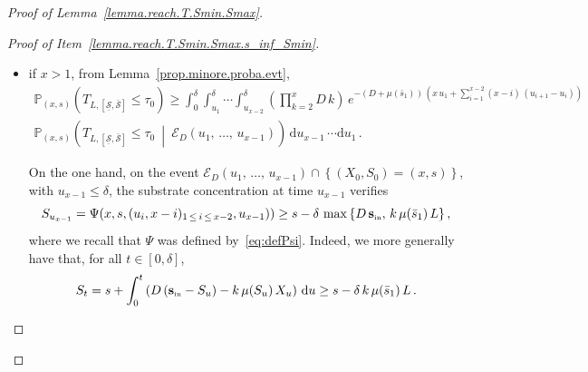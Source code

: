 \documentclass[10pt]{amsart}
\theoremstyle{definition}\newtheorem{defi}[theo]{Definition}\newtheorem{rema}[theo]{Remark}\newtheorem{exam}[theo]{Example}\newtheorem{exem}[theo]{Example}\newtheorem{nota}[theo]{Notation}
\newcommand{\PP}{\mathbb{P}}
\newcommand{\clE}{\mathcal{E}}
\newcommand{\Sin}{{\mathbf s}_{\textrm{\tiny\rm in}}}
\newcommand{\dif}{\mathrm{d}}
\newcommand{\Smin}{\underline{\mathcal{S}}}
\newcommand{\Smax}{\bar{\mathcal{S}}}
\newcommand{\barmu}{\mu(\bar s_1)}
\newcommand{\phit}{\phi_\textsf{t}^{-1}}
\newcommand{\1}{\mathbf{1}}
\begin{document}
\begin{proof}[Proof of Lemma~\ref{lemma.reach.T.Smin.Smax}]
\begin{proof}[{Proof of Item~\eqref{lemma.reach.T.Smin.Smax.s_inf_Smin}}]
\begin{itemize}
\begin{align*}
&\leq \phit \Big(1,s-\delta\,\max\left\{D\,\Sin,\,k\,\barmu\,L\right\},s\Big)+\phit \Big(1,s,\Smin\Big)
\\
&\leq T+\phit \Big(1,s,\Smin\Big) = \tau_0 - \delta\,.
\end{align*}
Then, since from Lemma~\ref{lem:rapprochement} $t\mapsto \phi(1, s_0,t)$ is increasing,
\begin{align*}
\phi(1,s_0,\tau_0-\delta) &\geq \phi\left(1,s_0,\phit\left(1, s_0,\Smin \right)\right)=\Smin\,.
\end{align*}
On the event $\{(X_0,S_0)=(1,s_0), \, T_1> \tau_0-\delta \}$, we then have $S_{\tau_0-\delta} \geq \Smin$ a.s. Since $(S_t)_{t\,\geq\,0}$ is a continuous process, from the intermediate value theorem, $(S_t)_{t\,\geq \,0}$ reaches $\Smin$ in the time interval $[0,\tau_0-\delta]$. Moreover, since $\Smin<\bar s_1$ then
\[
\PP_{(1,s_0)}
\left(T_{L,[\Smin,\Smax]}\leq \tau_0-\delta \, \middle| \, T_1> \tau_0-\delta\right)=1
\]
and therefore
\begin{align}\label{eq.reach.Smin.Smax.befor.tmax.x1}
\PP_{(1,s_0)}\left(T_{L,[\Smin,\Smax]}\leq \tau_0-\delta \right) &\geq e^{-(D+\barmu)\,(\tau_0-\delta)}\,.
\end{align}
Since $\PP_{(1,s)}(T_{L,[\Smin,\Smax]}\leq \tau_0) \geq \PP_{(1,s)}(T_{L,[\Smin,\Smax]}\leq \tau_0-\delta)$, taking $s_0=s$ leads to the result.

\item if $x>1$, from Lemma~\ref{prop.minore.proba.evt},
\begin{multline*}
\PP_{(x,s)}\left(T_{L,[\Smin,\Smax]}\leq \tau_0\right) \geq
\int_0^{\delta} \int_{u_1}^{\delta}\cdots \int_{u_{x-2}}^{\delta}
\left(\prod_{k=2}^{x}D\,k\right)\, e^{-(D+\barmu)\,\left(x\,u_1+\sum\limits_{i=1}^{x-2}(x-i)\,(u_{i+1}-u_{i})\right)}
\\
\PP_{(x,s)}
\left(T_{L,[\Smin,\Smax]}\leq\tau_0 \ \middle| \
\clE_D\left(u_1,\,\dots,\,u_{x-1}\right) \right)\,
\dif u_{x-1}\,\cdots \dif u_1\,.
\end{multline*}

On the one hand, on the event $\clE_D(u_1,\,\dots,\,u_{x-1})\cap \left\{(X_0,S_0)=(x,s)\right\}$, with $u_{x-1} \leq \delta$, the substrate concentration at time $u_{x-1}$ verifies
\[
S_{u_{x-1}}=\Psi(x,s,(u_i,x-i)_{1\,\leq\,i\,\leq\,x-2},u_{x-1}))\geq s-\delta\,\max\left\{D\,\Sin,\,k\,\barmu\,L\right\},
\]
where we recall that $\Psi$ was defined by~\eqref{eq:defPsi}. Indeed, we more generally have that, for all $t \in [0,\delta]$,
\[
S_t = s + \int_0^t \left(D\,(\Sin-S_u)-k\,\mu(S_u)\,X_u\right)\,\dif u
\geq s-\delta\,k\,\barmu\,L\,.
\]


\end{itemize}
\end{proof}
\end{proof}
\end{document}
